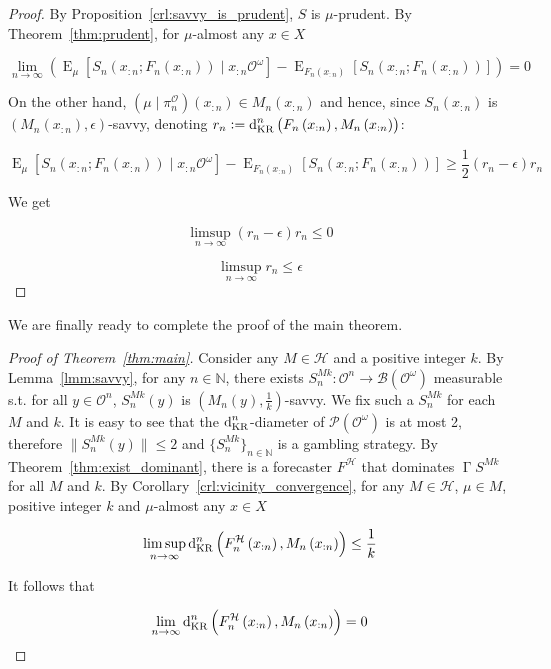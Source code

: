\documentclass[11pt]{article}
\theoremstyle{definition}
\theoremstyle{plain}
\newcommand{\Nats}{\mathbb{N}}
\newcommand{\N}[1]{\lVert #1 \rVert}
\newcommand{\Sq}[2]{\{#1\}_{#2 \in \Nats}}
\newcommand{\Sqn}[1]{\Sq{#1}{n}}
\DeclareMathOperator{\E}{E}
\newcommand{\PM}{\mathcal{P}}
\newcommand{\DKR}{\operatorname{d}_{\textnormal{KR}}}
\newcommand{\Ob}{\mathcal{O}}
\newcommand{\OO}{\Ob^\omega}
\newcommand{\PO}{\pi^\Ob}
\newcommand{\PMO}{\PM(\OO)}
\newcommand{\MC}{\mathcal{H}}
\newcommand{\Gm}{\mathcal{B}}
\newcommand{\GMO}{\Gm(\OO)}
\DeclareMathOperator{\PG}{\Gamma}
\begin{document}
\begin{proof}

By Proposition~\ref{crl:savvy_is_prudent}, $S$ is $\mu$-prudent. By Theorem~\ref{thm:prudent}, for $\mu$-almost any $x \in X$

$$\lim_{n \rightarrow \infty} {\left(\E_{\mu}\left[S_n\left(x_{:n};F_n\left(x_{:n}\right)\right) \mid x_{:n}\OO\right]-\E_{F_n\left(x_{:n}\right)}\left[S_n\left(x_{:n};F_n\left(x_{:n}\right)\right)\right]\right)} = 0$$

On the other hand, $\left(\mu \mid \PO_n\right)\left(x_{:n}\right) \in M_n\left(x_{:n}\right)$ and hence, since $S_n\left(x_{:n}\right)$ is $\left(M_n\left(x_{:n}\right),\epsilon\right)$-savvy, denoting $r_n:=\DKR^n\left(F_n\left(x_{:n}\right), M_n\left(x_{:n}\right)\right)$: 

$$\E_{\mu}\left[S_n\left(x_{:n};F_n\left(x_{:n}\right)\right) \mid x_{:n}\OO\right]-\E_{F_n\left(x_{:n}\right)}\left[S_n\left(x_{:n};F_n\left(x_{:n}\right)\right)\right] \geq \frac{1}{2} \left(r_{n} - \epsilon\right) r_n$$

We get

$$\limsup_{n \rightarrow \infty} {\left(r_{n} - \epsilon\right) r_n} \leq 0$$

$$\limsup_{n \rightarrow \infty} {r_n} \leq \epsilon$$
\end{proof}

We are finally ready to complete the proof of the main theorem.

\begin{proof}[Proof of Theorem~\ref{thm:main}]

Consider any $M \in \MC$ and a positive integer $k$. By Lemma~\ref{lmm:savvy}, for any $n \in \Nats$, there exists ${S^{Mk}_{n}: \Ob^n \rightarrow \GMO}$ measurable s.t. for all $y \in \Ob^n$, $S^{Mk}_{n}\left(y\right)$ is $\left(M_n(y),\frac{1}{k}\right)$-savvy. We fix such a $S^{Mk}_{n}$ for each $M$ and $k$. It is easy to see that the $\DKR^n$-diameter of $\PMO$ is at most 2, therefore $\N{S^{Mk}_{n}\left(y\right)} \leq 2$ and $\Sqn{S^{Mk}_{n}}$ is a gambling strategy. By Theorem~\ref{thm:exist_dominant}, there is a forecaster $F^\MC$ that dominates $\PG{S}^{Mk}$ for all $M$ and $k$. By Corollary~\ref{crl:vicinity_convergence}, for any $M \in \MC$, $\mu \in M$, positive integer $k$ and $\mu$-almost any $x \in X$

$$\limsup_{n \rightarrow \infty} {\DKR^n\left(F^\MC_n\left(x_{:n}\right),M_n\left(x_{:n}\right)\right)} \leq \frac{1}{k}$$

It follows that

$$\lim_{n \rightarrow \infty} {\DKR^n\left(F^\MC_n\left(x_{:n}\right),M_n\left(x_{:n}\right)\right)} = 0$$
\end{proof}
\end{document}
